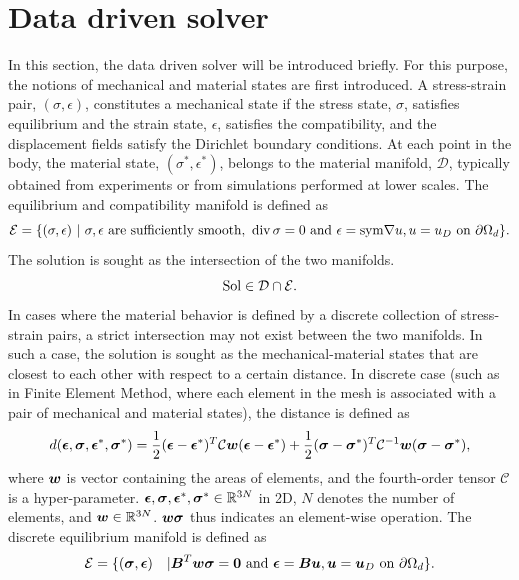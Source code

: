 \documentclass[10pt]{cas-sc}
\begin{document}
\section{Data driven solver}
In this section, the data driven solver \cite{Kirchdoerfer2016} will be introduced briefly. For this purpose, the notions of mechanical and material states are first introduced. A stress-strain pair, $(\sigma,\epsilon)$, constitutes a mechanical state if the stress state, $\sigma$, satisfies equilibrium and the strain state, $\epsilon$, satisfies the compatibility, and the displacement fields satisfy the Dirichlet boundary conditions. At each point in the body, the material state, $(\sigma^*,\epsilon^*)$, belongs to the material manifold, $\mathcal{D}$, typically obtained from experiments or from simulations performed at lower scales. The equilibrium and compatibility manifold is defined as 
\begin{equation}
	\mathcal{E} = \{ (\sigma,\epsilon) \text{ }|\text{ } \sigma,\epsilon \text{ are sufficiently smooth, } \operatorname{div} \sigma = 0 \text{ and } \epsilon=\mathrm{sym}\nabla u, u=u_D \text{ on } \partial \Omega_d  \}.
\end{equation}
The solution is sought as the intersection of the two manifolds.
\begin{equation}
	{\rm Sol} \in \mathcal{D} \cap \mathcal{E}.
\end{equation}
In cases where the material behavior is defined by a discrete collection of stress-strain pairs, a strict intersection may not exist between the two manifolds. In such a case, the solution is sought as the mechanical-material states that are closest to each other with respect to a certain distance. In discrete case (such as in Finite Element Method, where each element in the mesh is associated with a pair of mechanical and material states), the distance is defined as  
\begin{equation}
	d(\mbox{\boldmath $\epsilon$},\mbox{\boldmath $\sigma$},\mbox{\boldmath $\epsilon$}^*,\mbox{\boldmath $\sigma$}^*) = \frac{1}{2}(\mbox{\boldmath $\epsilon$} - \mbox{\boldmath $\epsilon$}^*)^T\mathcal{C} \mbox{\boldmath $w$}(\mbox{\boldmath $\epsilon$} - \mbox{\boldmath $\epsilon$}^*) + \frac{1}{2}(\mbox{\boldmath $\sigma$} - \mbox{\boldmath $\sigma$}^*)^T\mathcal{C}^{-1}\mbox{\boldmath $w$}(\mbox{\boldmath $\sigma$} - \mbox{\boldmath $\sigma$}^*), \label{distance_func_orig}
\end{equation}
where $\mbox{\boldmath $w$}$ is vector containing the areas of elements, and the fourth-order tensor $\mathcal{C}$ is a hyper-parameter. $\mbox{\boldmath $\epsilon$},\mbox{\boldmath $\sigma$},\mbox{\boldmath $\epsilon$}^*, \mbox{\boldmath $\sigma$}^* \in \mathbb{R}^{3N}$ in 2D, $N$ denotes the number of elements, and $\mbox{\boldmath $w$} \in \mathbb{R}^{3N}$. $\mbox{\boldmath $w$} \mbox{\boldmath $\sigma$}$ thus indicates an element-wise operation. The discrete equilibrium manifold is defined as  
\begin{equation}
	\mathcal{E} = \{ (\mbox{\boldmath $\sigma$},\mbox{\boldmath $\epsilon$}) \quad | \mbox{\boldmath $B$}^T \mbox{\boldmath $w$}\mbox{\boldmath $\sigma$} = \boldsymbol{0} \text{ and } \mbox{\boldmath $\epsilon$}=\mbox{\boldmath $B$} \mbox{\boldmath $u$}, \mbox{\boldmath $u$}=\mbox{\boldmath $u$}_D \text{ on } \partial \Omega_d  \}.
\end{equation}
\end{document}
